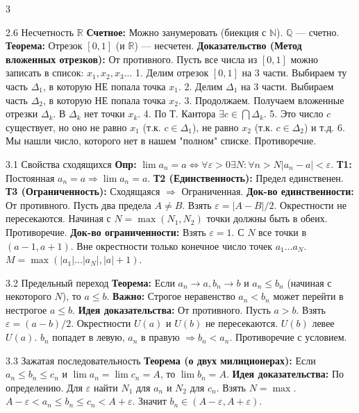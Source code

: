\documentclass[8pt, a4paper, landscape]{extarticle}
\newcommand{\Ra}{\Rightarrow}
\newcommand{\N}{\mathbb{N}}
\newcommand{\Q}{\mathbb{Q}}
\newcommand{\R}{\mathbb{R}}
\newcommand{\eps}{\varepsilon}
\begin{document}
\begin{multicols*}{3}
\begin{ticket}{2.6 Несчетность $\R$}
\textbf{Счетное:} Можно занумеровать (биекция с $\N$). $\Q$ — счетно.
\textbf{Теорема:} Отрезок $[0, 1]$ (и $\R$) — несчетен.
\tcblower
\textbf{Доказательство (Метод вложенных отрезков):}
От противного. Пусть все числа из $[0, 1]$ можно записать в список: $x_1, x_2, x_3 \dots$
1. Делим отрезок $[0, 1]$ на 3 части.
Выбираем ту часть $\Delta_1$, в которую НЕ попала точка $x_1$.
2. Делим $\Delta_1$ на 3 части.
Выбираем часть $\Delta_2$, в которую НЕ попала точка $x_2$.
3. Продолжаем. Получаем вложенные отрезки $\Delta_k$.
В $\Delta_k$ нет точки $x_k$.
4. По Т. Кантора $\exists c \in \bigcap \Delta_k$.
5. Это число $c$ существует, но оно не равно $x_1$ (т.к. $c \in \Delta_1$), не равно $x_2$ (т.к. $c \in \Delta_2$) и т.д.
6. Мы нашли число, которого нет в нашем "полном" списке. Противоречие.
\end{ticket}



\begin{ticket}{3.1 Свойства сходящихся}
\textbf{Опр:} $\lim a_n = a \iff \forall \eps>0 \exists N: \forall n>N |a_n-a|<\eps$.
\textbf{Т1:} Постоянная $a_n=a \Ra \lim a_n=a$.
\textbf{Т2 (Единственность):} Предел единственен.
\textbf{Т3 (Ограниченность):} Сходящаяся $\Ra$ Ограниченная.
\tcblower
\textbf{Док-во единственности:}
От противного. Пусть два предела $A \ne B$.
Взять $\eps = |A-B|/2$. Окрестности не пересекаются.
Начиная с $N = \max(N_1, N_2)$ точки должны быть в обеих. Противоречие.
\textbf{Док-во ограниченности:}
Взять $\eps=1$. С $N$ все точки в $(a-1, a+1)$.
Вне окрестности только конечное число точек $a_1 \dots a_N$.
$M = \max(|a_1| \dots |a_N|, |a|+1)$.
\end{ticket}

\begin{ticket}{3.2 Предельный переход}
\textbf{Теорема:} Если $a_n \to a, b_n \to b$ и $a_n \le b_n$ (начиная с некоторого $N$), то $a \le b$.
\textbf{Важно:} Строгое неравенство $a_n < b_n$ может перейти в нестрогое $a \le b$.
\tcblower
\textbf{Идея доказательства:}
От противного. Пусть $a > b$.
Взять $\eps = (a-b)/2$.
Окрестности $U(a)$ и $U(b)$ не пересекаются.
$U(b)$ левее $U(a)$.
$b_n$ попадет в левую, $a_n$ в правую $\Ra b_n < a_n$. Противоречие с условием.
\end{ticket}

\begin{ticket}{3.3 Зажатая последовательность}
\textbf{Теорема (о двух милиционерах):}
Если $a_n \le b_n \le c_n$ и $\lim a_n = \lim c_n = A$, то $\lim b_n = A$.
\tcblower
\textbf{Идея доказательства:}
По определению.
Для $\eps$ найти $N_1$ для $a_n$ и $N_2$ для $c_n$.
Взять $N = \max$.
$A-\eps < a_n \le b_n \le c_n < A+\eps$.
Значит $b_n \in (A-\eps, A+\eps)$.
\end{ticket}


\end{multicols*}
\end{document}
